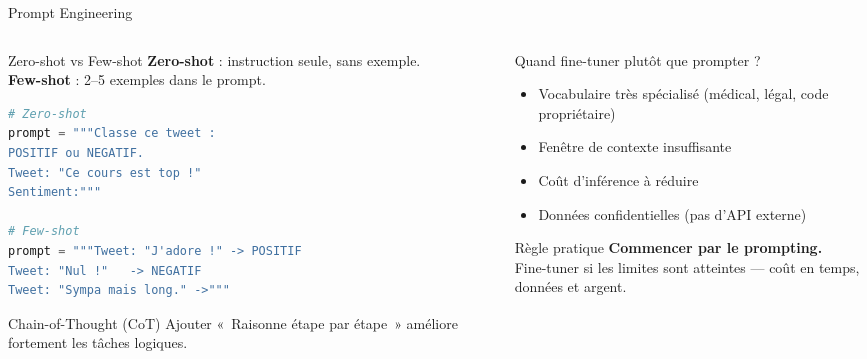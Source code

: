 \documentclass[aspectratio=169, 10pt]{beamer}
\begin{document}
\begin{frame}[fragile]{Prompt Engineering}
  \begin{columns}[T]
    \begin{column}{0.52\textwidth}
      \begin{block}{Zero-shot vs Few-shot}
        \textbf{Zero-shot} : instruction seule, sans exemple.\\[2pt]
        \textbf{Few-shot} : 2--5 exemples dans le prompt.
      \end{block}
\begin{lstlisting}[language=Python, basicstyle=\tiny\ttfamily]
# Zero-shot
prompt = """Classe ce tweet :
POSITIF ou NEGATIF.
Tweet: "Ce cours est top !"
Sentiment:"""

# Few-shot
prompt = """Tweet: "J'adore !" -> POSITIF
Tweet: "Nul !"   -> NEGATIF
Tweet: "Sympa mais long." ->"""
\end{lstlisting}
      \begin{alertblock}{Chain-of-Thought (CoT)}
        Ajouter «~Raisonne étape par étape~»
        améliore fortement les tâches logiques.
      \end{alertblock}
    \end{column}
    \begin{column}{0.44\textwidth}
      \begin{block}{Quand fine-tuner plutôt que prompter ?}
        \begin{itemize}
          \item Vocabulaire très spécialisé
                (médical, légal, code propriétaire)
          \item Fenêtre de contexte insuffisante
          \item Coût d'inférence à réduire
          \item Données confidentielles
                (pas d'API externe)
        \end{itemize}
      \end{block}
      \smallskip
      \begin{exampleblock}{Règle pratique}
        \textbf{Commencer par le prompting.}\\[2pt]
        Fine-tuner si les limites sont atteintes ---
        coût en temps, données et argent.
      \end{exampleblock}
    \end{column}
  \end{columns}
\end{frame}
\end{document}
